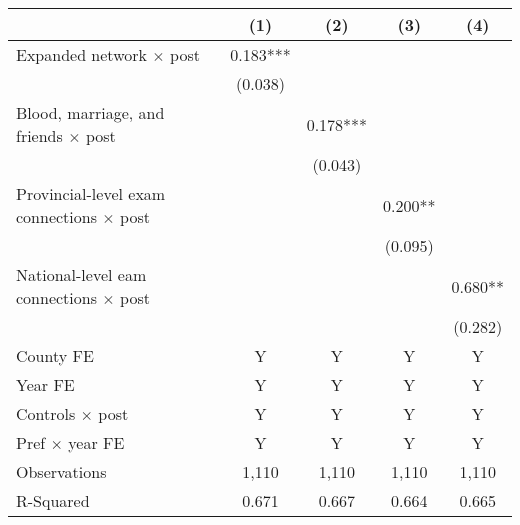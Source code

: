 \begin{tabular}{l*{4}{c}}
\hline \hline
& (1) & (2) & (3) & (4) \\ \hline
Expanded network $ \times $ post&       0.183***&               &               &               \\
                    &     (0.038)   &               &               &               \\
Blood, marriage, and friends $ \times $ post&               &       0.178***&               &               \\
                    &               &     (0.043)   &               &               \\
Provincial-level exam connections $ \times $ post&               &               &       0.200** &               \\
                    &               &               &     (0.095)   &               \\
National-level eam connections $ \times $ post&               &               &               &       0.680** \\
                    &               &               &               &     (0.282)   \\
\hline
County FE      & Y & Y & Y & Y \\ 
Year FE        & Y & Y & Y & Y \\ 
Controls $ \times $ post       & Y & Y & Y & Y \\ 
Pref $ \times $ year FE        & Y & Y & Y & Y \\ 
Observations        &       1,110   &       1,110   &       1,110   &       1,110   \\
R-Squared           &       0.671   &       0.667   &       0.664   &       0.665   \\
\hline\hline
\end{tabular}
